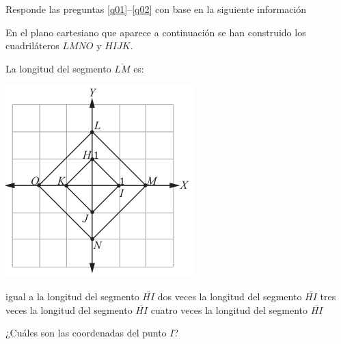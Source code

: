 \documentclass[addpoints]{exam}
\begin{document}
\begin{multicols}{2}
Responde las preguntas \ref{q01}--\ref{q02} con base en la siguiente información

En el plano cartesiano que aparece a continuación se han construido los cuadriláteros $LMNO$ y $HIJK$.
\begin{questions}
\question La longitud del segmento $ \overline{LM} $ es:\label{q01}
\begin{center}
\includegraphics[scale=0.45]{Images/plano.png}
\end{center}
\begin{choices}
  \choice igual a la longitud del segmento $ \overline{HI} $
  \CorrectChoice dos veces la longitud del segmento $ \overline{HI} $
  \choice tres veces la longitud del segmento $ \overline{HI} $
  \choice cuatro veces la longitud del segmento $ \overline{HI} $
\end{choices}
\question ¿Cuáles son las coordenadas del punto $ I $? 
 

\end{questions}
\end{multicols}
\end{document}
